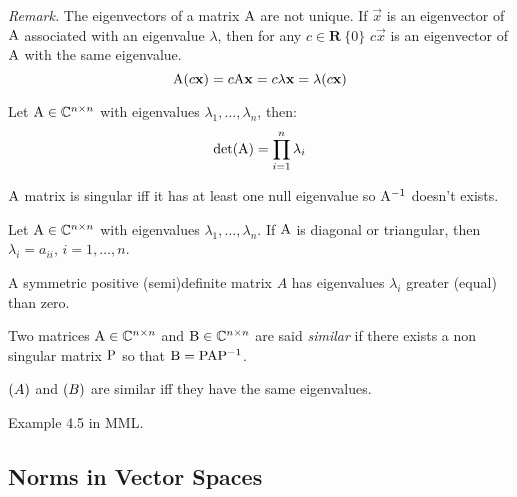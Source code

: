 \textit{Remark.} The eigenvectors of a matrix $\mathrm{A}$ are not unique. If $\vec{x}$ is an eigenvector of $\mathrm{A}$ associated with an eigenvalue $\lambda$, then for any $c \in \mathbf{R}\ \{0\}$ $c\vec{x}$ is an eigenvector of $\mathrm{A}$ with the same eigenvalue.
$$\mathrm{A} (c \mathbf{x})=c \mathrm{A} \mathbf{x}=c \lambda \mathbf{x}= \lambda (c\mathbf{x})$$

\begin{proposition}
    Let $\mathrm{A} \in \mathbb{C}^{n \times n}$ with eigenvalues $\lambda_1, \hdots, \lambda_n$, then:
    $$ \mathrm{det}{(\mathrm{A})} = \prod_{i=1}^{n}{\lambda_i} $$
\end{proposition}

\begin{proposition}
    $\mathrm{A}$ matrix is singular iff it has at least one null eigenvalue so $\mathrm{A}^{-1}$ doesn't exists.
\end{proposition}

\begin{proposition}
    Let $\mathrm{A} \in \mathbb{C}^{n \times n}$ with eigenvalues $\lambda_1, \hdots, \lambda_n$. If $\mathrm{A}$ is diagonal or triangular, then $\lambda_i = a_{ii}$, $i = 1, \hdots, n$.
\end{proposition}

\begin{proposition}
 A symmetric positive (semi)definite matrix $A$ has eigenvalues $\lambda_i$ greater (equal) than zero.
 \end{proposition}
 
\begin{definition}
    Two matrices $\mathrm{A} \in \mathbb{C}^{n \times n}$ and $\mathrm{B} \in \mathbb{C}^{n \times n}$ are said \textit{similar} if there exists a non singular matrix $\mathrm{P}$ so that $\mathrm{B} = \mathrm{PA}\mathrm{P}^{-1}$.
   \end{definition}

\begin{property}
    $\mathrm{(}A)$ and $\mathrm{(}B)$ are similar iff they have the same eigenvalues. 
\end{property}

Example 4.5 in MML.
\subsection{Norms in Vector Spaces}

